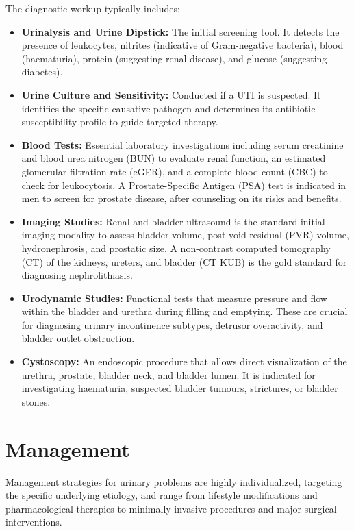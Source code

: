 The diagnostic workup typically includes:
\begin{itemize}
    \item \textbf{Urinalysis and Urine Dipstick:} The initial screening tool. It detects the presence of leukocytes, nitrites (indicative of Gram-negative bacteria), blood (haematuria), protein (suggesting renal disease), and glucose (suggesting diabetes).
    \item \textbf{Urine Culture and Sensitivity:} Conducted if a UTI is suspected. It identifies the specific causative pathogen and determines its antibiotic susceptibility profile to guide targeted therapy.
    \item \textbf{Blood Tests:} Essential laboratory investigations including serum creatinine and blood urea nitrogen (BUN) to evaluate renal function, an estimated glomerular filtration rate (eGFR), and a complete blood count (CBC) to check for leukocytosis. A Prostate-Specific Antigen (PSA) test is indicated in men to screen for prostate disease, after counseling on its risks and benefits.
    \item \textbf{Imaging Studies:} Renal and bladder ultrasound is the standard initial imaging modality to assess bladder volume, post-void residual (PVR) volume, hydronephrosis, and prostatic size. A non-contrast computed tomography (CT) of the kidneys, ureters, and bladder (CT KUB) is the gold standard for diagnosing nephrolithiasis.
    \item \textbf{Urodynamic Studies:} Functional tests that measure pressure and flow within the bladder and urethra during filling and emptying. These are crucial for diagnosing urinary incontinence subtypes, detrusor overactivity, and bladder outlet obstruction.
    \item \textbf{Cystoscopy:} An endoscopic procedure that allows direct visualization of the urethra, prostate, bladder neck, and bladder lumen. It is indicated for investigating haematuria, suspected bladder tumours, strictures, or bladder stones.
\end{itemize}

\section*{Management}
Management strategies for urinary problems are highly individualized, targeting the specific underlying etiology, and range from lifestyle modifications and pharmacological therapies to minimally invasive procedures and major surgical interventions.

